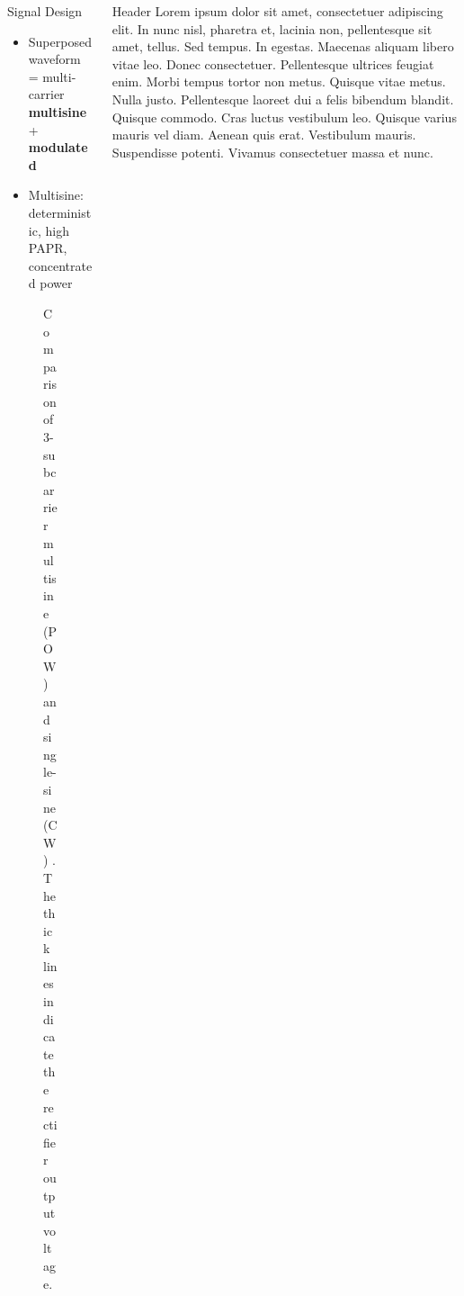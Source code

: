 \documentclass[xcolor={table}]{beamer}
\begin{document}
\begin{frame}[fragile=singleslide,t]
\begin{columns}[onlytextwidth,T]
\begin{column}{.47\textwidth}
\begin{block}{Signal Design}
\begin{itemize}
  \item Superposed waveform = multi-carrier \textbf{multisine} + \textbf{modulated}
  \item Multisine: deterministic, high PAPR, concentrated power
\end{itemize}
\begin{figure}
  \centering
  \caption{Comparison of 3-subcarrier multisine (POW) and single-sine (CW) \citep{Trotter2009}. The thick lines indicate the rectifier output voltage.}
  \label{fig:waveform_comparison}
\end{figure}
\end{block}

\end{column}


\begin{column}{.47\textwidth}

\begin{block}{Header}
Lorem ipsum dolor sit amet, consectetuer adipiscing elit. In nunc nisl, pharetra et, lacinia non, pellentesque sit amet, tellus. Sed tempus. In egestas. Maecenas aliquam libero vitae leo. Donec consectetuer. Pellentesque ultrices feugiat enim. Morbi tempus tortor non metus. Quisque vitae metus. Nulla justo. Pellentesque laoreet dui a felis bibendum blandit. Quisque commodo.
Cras luctus vestibulum leo. Quisque varius mauris vel diam. Aenean quis erat. Vestibulum mauris. Suspendisse potenti. Vivamus consectetuer massa et nunc.
\end{block}


\end{column}
\end{columns}
\end{frame}
\end{document}
